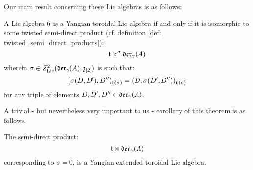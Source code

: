         Our main result concerning these Lie algebras is as follows:
        \begin{theorem} \label{theorem: yangian_extended_toroidal_lie_algebras_preliminary_version}
            A Lie algebra $\mathfrak{y}$ is a Yangian toroidal Lie algebra if and only if it is isomorphic to some twisted semi-direct product (cf. definition \ref{def: twisted_semi_direct_products}):
                $$\mathfrak{t} \rtimes^{\sigma} \mathfrak{der}_{\gamma}(A)$$
            wherein $\sigma \in Z^2_{\mathrm{Lie}}(\mathfrak{der}_{\gamma}(A), \mathfrak{z}_{[2]})$ is such that:
                $$(\sigma(D, D'), D'')_{\mathfrak{y}(\sigma)} = (D, \sigma(D', D''))_{\mathfrak{y}(\sigma)}$$
            for any triple of elements $D, D', D'' \in \mathfrak{der}_{\gamma}(A)$.
        \end{theorem}
        A trivial - but nevertheless very important to us - corollary of this theorem is as follows.
        \begin{corollary}
            The semi-direct product:
                $$\mathfrak{t} \rtimes \mathfrak{der}_{\gamma}(A)$$
            corresponding to $\sigma = 0$, is a Yangian extended toroidal Lie algebra.
        \end{corollary}
        